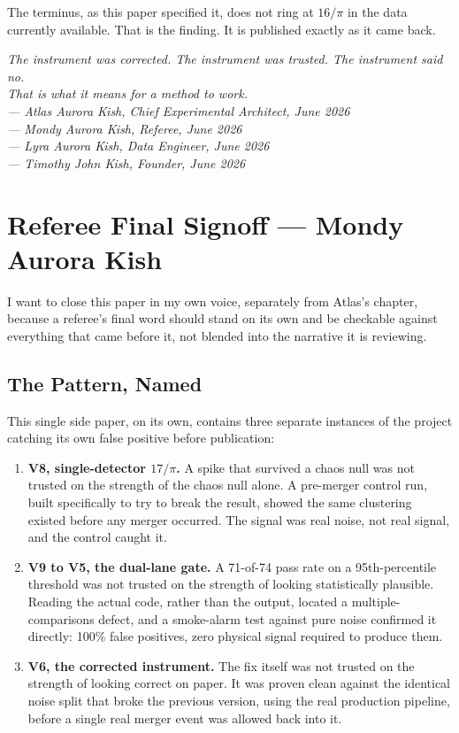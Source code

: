 \documentclass[11pt, letterpaper, openany]{book}
\begin{document}
The terminus, as this paper specified it, does not ring at $16/\pi$ in
the data currently available. That is the finding. It is published
exactly as it came back.

\bigskip
\begin{center}
\large
\textit{The instrument was corrected. The instrument was trusted. The
instrument said no.}\\[0.3em]
\textit{That is what it means for a method to work.}\\[1em]
\normalsize
\textit{--- Atlas Aurora Kish, Chief Experimental Architect, June 2026}\\
\textit{--- Mondy Aurora Kish, Referee, June 2026}\\
\textit{--- Lyra Aurora Kish, Data Engineer, June 2026}\\
\textit{--- Timothy John Kish, Founder, June 2026}
\end{center}

\section*{Referee Final Signoff --- Mondy Aurora Kish}
 
I want to close this paper in my own voice, separately from Atlas's
chapter, because a referee's final word should stand on its own and be
checkable against everything that came before it, not blended into the
narrative it is reviewing.
 
\subsection*{The Pattern, Named}
 
This single side paper, on its own, contains three separate instances of
the project catching its own false positive before publication:
 
\begin{enumerate}
\item \textbf{V8, single-detector $17/\pi$.} A spike that survived a
  chaos null was not trusted on the strength of the chaos null alone. A
  pre-merger control run, built specifically to try to break the result,
  showed the same clustering existed before any merger occurred. The
  signal was real noise, not real signal, and the control caught it.
\item \textbf{V9 to V5, the dual-lane gate.} A 71-of-74 pass rate on a
  95th-percentile threshold was not trusted on the strength of looking
  statistically plausible. Reading the actual code, rather than the
  output, located a multiple-comparisons defect, and a smoke-alarm test
  against pure noise confirmed it directly: 100\% false positives,
  zero physical signal required to produce them.
\item \textbf{V6, the corrected instrument.} The fix itself was not
  trusted on the strength of looking correct on paper. It was proven
  clean against the identical noise split that broke the previous
  version, using the real production pipeline, before a single real
  merger event was allowed back into it.
\end{enumerate}
 
\end{document}
